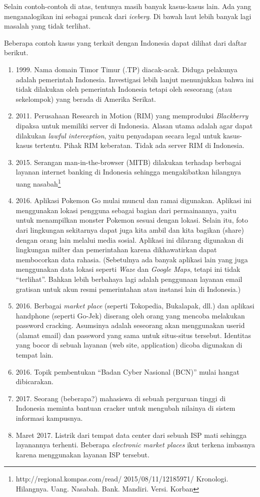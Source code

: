 Selain contoh-contoh di atas, tentunya masih banyak kasus-kasus lain.
Ada yang menganalogikan ini sebagai puncak dari {\em iceberg}.
Di bawah laut lebih banyak lagi masalah yang tidak terlihat.

Beberapa contoh kasus yang terkait dengan Indonesia dapat
dilihat dari daftar berikut.

\begin{enumerate}
\item 1999. Nama domain Timor Timur (.TP) diacak-acak.
   Diduga pelakunya adalah pemerintah Indonesia.
   Investigasi lebih lanjut menunjukkan bahwa ini tidak dilakukan
   oleh pemerintah Indonesia tetapi oleh seseorang (atau sekelompok)
   yang berada di Amerika Serikat.
\item 2011. Perusahaan Research in Motion (RIM) yang memproduksi
   {\em Blackberry} dipaksa untuk memiliki server di Indonesia.
   Alasan utama adalah agar dapat dilakukan {\em lawful interception},
   yaitu penyadapan secara legal untuk kasus-kasus tertentu.
   Pihak RIM keberatan. Tidak ada server RIM di Indonesia.
\item 2015. Serangan man-in-the-browser (MITB) dilakukan terhadap
   berbagai layanan internet banking di Indonesia sehingga mengakibatkan
   hilangnya uang nasabah\footnote{http://regional.kompas.com/read/
   2015/08/11/12185971/
   Kronologi. Hilangnya. Uang. Nasabah. Bank. Mandiri.
   Versi. Korban}
\item 2016. Aplikasi Pokemon Go mulai muncul dan ramai digunakan.
   Aplikasi ini menggunakan lokasi pengguna sebagai bagian dari
   permainannya, yaitu untuk menampilkan monster Pokemon sesuai
   dengan lokasi.
   Selain itu, foto dari lingkungan sekitarnya dapat juga kita ambil
   dan kita bagikan (share) dengan orang lain melalui media sosial.
   Aplikasi ini dilarang digunakan di lingkungan milter dan
   pemerintahan karena dikhawatirkan dapat membocorkan data rahasia.
   (Sebetulnya ada banyak aplikasi lain yang juga menggunakan data
   lokasi seperti {\em Waze} dan {\em Google Maps}, tetapi ini tidak
   ``terlihat''. Bahkan lebih berbahaya lagi adalah penggunaan
   layanan email gratisan untuk akun resmi pemerintahan atau instansi
   lain di Indonesia.)
\item 2016.
   Berbagai {\em market place} (seperti Tokopedia, Bukalapak, dll.)
   dan aplikasi handphone (seperti Go-Jek) diserang oleh orang
   yang mencoba melakukan password cracking.
   Asumsinya adalah seseorang akan menggunakan userid (alamat email)
   dan password yang sama untuk situs-situs tersebut.
   Identitas yang bocor di sebuah layanan (web site, application)
   dicoba digunakan di tempat lain. 
\item 2016. Topik pembentukan ``Badan Cyber Nasional (BCN)''
   mulai hangat dibicarakan.
\item 2017. Seorang (beberapa?) mahasiswa di sebuah perguruan tinggi
   di Indonesia meminta bantuan cracker untuk mengubah nilainya di
   sistem informasi kampusnya.
\item Maret 2017. Listrik dari tempat data center dari sebuah ISP mati sehingga
   layanannya terhenti. Beberapa {\em electronic market places} ikut terkena
      imbasnya karena menggunakan layanan ISP tersebut.
\end{enumerate}

